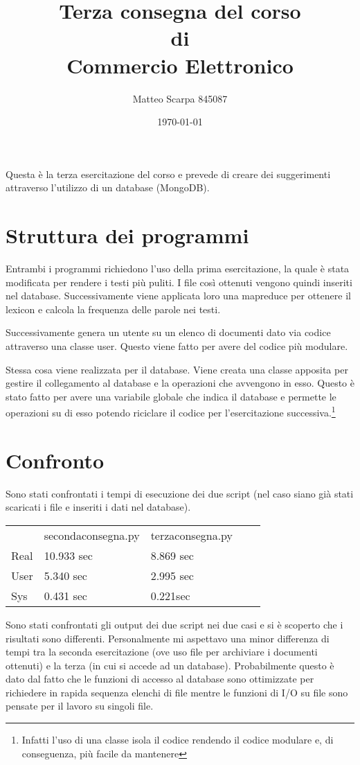 \documentclass[a4paper]{article}
\title{Terza consegna del corso \\di \\Commercio Elettronico}
\author{Matteo Scarpa 845087}
\date{\today}
\begin{document}
	\maketitle
	
	Questa è la terza esercitazione del corso e prevede di creare dei suggerimenti attraverso l'utilizzo di un database (MongoDB). 
	
	\section*{Struttura dei programmi}
	Entrambi i programmi richiedono l'uso della prima esercitazione, la quale è stata modificata per rendere i testi più puliti.  I file così ottenuti vengono quindi inseriti nel database. Successivamente viene applicata loro una mapreduce per ottenere il lexicon e calcola la frequenza delle parole nei testi.
	
Successivamente genera un utente su un elenco di documenti dato	via codice attraverso una classe user. Questo viene fatto per avere del codice più modulare.

Stessa cosa viene realizzata per il database. Viene creata una classe apposita per gestire il collegamento al database e la operazioni che avvengono in esso. Questo è stato fatto per avere una variabile globale che indica il database e permette le operazioni su di esso potendo riciclare il codice per l'esercitazione successiva.\footnote{Infatti l'uso di una classe isola il codice rendendo il codice modulare e, di conseguenza, più facile da mantenere}
			
	\section*{Confronto}
	Sono stati confrontati i tempi di esecuzione dei due script (nel caso siano già stati scaricati i file e inseriti i dati nel database).
\begin{table}[h]
\begin{tabular}{|l|l|l|ll}
\cline{1-3}
 & secondaconsegna.py & terzaconsegna.py &  &  \\ \cline{1-3}
Real & 10.933 sec & 8.869 sec&  &  \\ \cline{1-3}
User & 5.340 sec & 2.995 sec&  &  \\ \cline{1-3}
Sys & 0.431 sec & 0.221sec &  &  \\ \cline{1-3}
\end{tabular}
\end{table}

Sono stati confrontati gli output dei due script nei due casi e si è scoperto che i risultati sono differenti. Personalmente mi aspettavo una minor differenza di tempi tra la seconda esercitazione (ove uso file per archiviare i documenti ottenuti) e la terza (in cui si accede ad un database). Probabilmente questo è dato dal fatto che le funzioni di accesso al database sono ottimizzate per richiedere in rapida sequenza elenchi di file mentre le funzioni di I/O su file sono pensate per il lavoro su singoli file.
\end{document}
